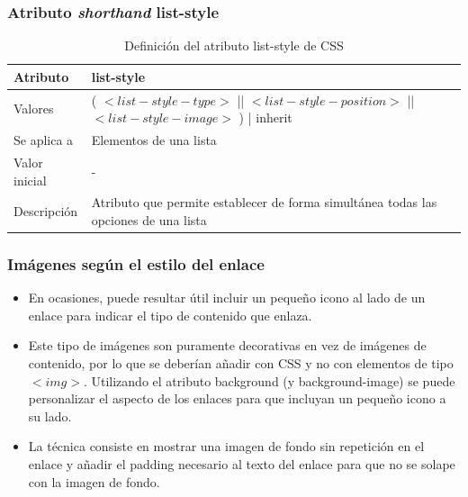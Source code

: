 \documentclass[ucs]{beamer}
\begin{document}
\begin{frame}
\frametitle{Atributo \emph{shorthand} list-style}

\begin{center}
  \begin{table}
   \begin{tabular}{p{1.8cm}p{7.8cm}}
Atributo & \bf{list-style} \\ \hline
Valores& ( $<list-style-type>$ || $<list-style-position>$ || $<list-style-image>$ ) | inherit \\ \hline
Se aplica a& Elementos de una lista \\ \hline
Valor inicial& - \\ \hline
Descripción& Atributo que permite establecer de forma simultánea todas las opciones de una lista \\ \hline
  \end{tabular}
   \caption{Definición del atributo list-style de CSS}
 \end{table}
\end{center}


\end{frame}



\begin{frame}
\frametitle{Imágenes según el estilo del enlace}

\begin{itemize}
  \item En ocasiones, puede resultar útil incluir un pequeño icono al lado de un enlace para indicar el tipo de contenido que enlaza.
  \item Este tipo de imágenes son puramente decorativas en vez de imágenes de contenido, por lo que se deberían añadir con CSS y no con elementos de tipo $<img>$. Utilizando el atributo background (y background-image) se puede personalizar el aspecto de los enlaces para que incluyan un pequeño icono a su lado.
  \item La técnica consiste en mostrar una imagen de fondo sin repetición en el enlace y añadir el padding necesario al texto del enlace para que no se solape con la imagen de fondo.
\end{itemize}

\end{frame}


\end{document}
